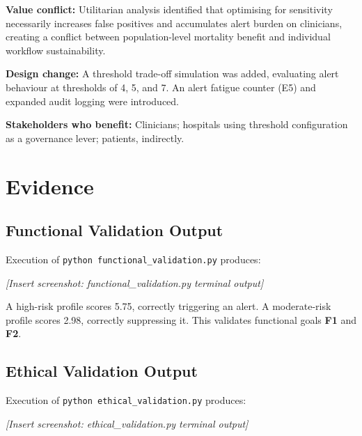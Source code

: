 \documentclass[]{UCD_CS_41820_Report}
\begin{document}
\textbf{Value conflict:} Utilitarian analysis identified that optimising for
sensitivity necessarily increases false positives and accumulates alert burden
on clinicians, creating a conflict between population-level mortality benefit and
individual workflow sustainability.\par
\medskip

\textbf{Design change:} A threshold trade-off simulation was added, evaluating
alert behaviour at thresholds of 4, 5, and 7. An alert fatigue counter (E5) and
expanded audit logging were introduced.\par
\medskip

\textbf{Stakeholders who benefit:} Clinicians; hospitals using threshold
configuration as a governance lever; patients, indirectly.

\section{Evidence}

\subsection*{Functional Validation Output}

Execution of \texttt{python functional\_validation.py} produces:

\noindent\textit{[Insert screenshot: functional\_validation.py terminal output]}

A high-risk profile scores 5.75, correctly triggering an alert. A moderate-risk
profile scores 2.98, correctly suppressing it. This validates functional goals
\textbf{F1} and \textbf{F2}.

\subsection*{Ethical Validation Output}

Execution of \texttt{python ethical\_validation.py} produces:

\noindent\textit{[Insert screenshot: ethical\_validation.py terminal output]}
\end{document}
